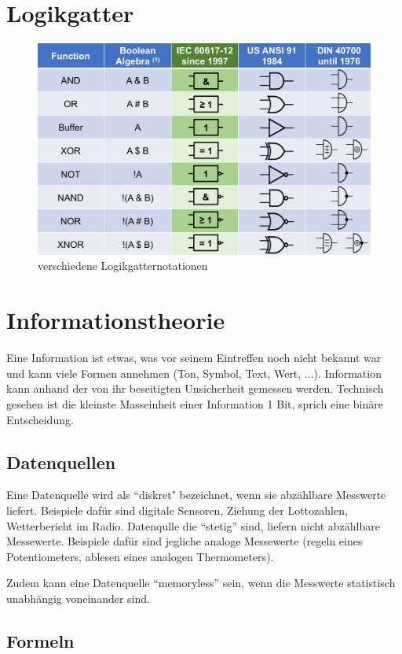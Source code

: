 \documentclass{article}
\author{Philipp Kiss}
\begin{document}
\tableofcontents
\newpage

\section{Logikgatter}
\begin{figure}[h]
		\includegraphics[width=\linewidth]{img/logikgatter.png}
		\caption{verschiedene Logikgatternotationen}
		\label{fig:verschiedene Logikgatternotationen}
\end{figure}
\section{Informationstheorie}
Eine Information ist etwas, was vor seinem Eintreffen noch nicht bekannt war und kann viele Formen annehmen (Ton, Symbol, Text, Wert, ...). Information kann anhand der von ihr beseitigten Unsicherheit gemessen werden. Technisch gesehen ist die kleinste Masseinheit einer Information 1 Bit, sprich eine binäre Entscheidung.
\subsection{Datenquellen}
Eine Datenquelle wird als ``diskret" bezeichnet, wenn sie abzählbare Messwerte liefert. Beispiele dafür sind digitale Sensoren, Ziehung der Lottozahlen, Wetterbericht im Radio. Datenqulle die ``stetig'' sind, liefern nicht abzählbare Messewerte. Beispiele dafür sind jegliche analoge Messewerte (regeln eines Potentiometers, ablesen eines analogen Thermometers).

Zudem kann eine Datenquelle ``memoryless'' sein, wenn die Messwerte statistisch unabhängig voneinander sind.
\subsection{Formeln}
\end{document}
